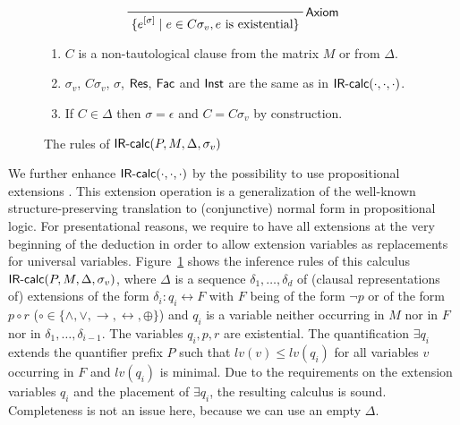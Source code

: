 \documentclass{llncs}
\newcommand{\IRcalcPMSubst}[3]{$\mbox{\sf IR-calc}(#1,#2,#3)$}
\newcommand{\IRcalcPMDSubst}[4]{$\mbox{\sf IR-calc}(#1,#2,#3,#4)$}
\newcommand{\Res}{$\mbox{\sf Res}$}
\newcommand{\Fac}{$\mbox{\sf Fac}$}
\newcommand{\Axiom}{$\mbox{\sf Axiom}$}
\newcommand{\Inst}{$\mbox{\sf Inst}$}
\newcommand{\restrict}[1]{\ensuremath{[#1]}}
\newcommand{\impl}{\rightarrow}
\newcommand{\lequiv}{\leftrightarrow}
\newcommand{\xor}{\oplus}
\newcommand{\level}[1]{{\mathit lv(#1)}}
\begin{document}
\begin{figure}[t]
\begin{mdframed}
\begin{displaymath}
\prfbyaxiom{\Axiom}{\{e^{\restrict{\sigma}} \mid e \in C\sigma_v,
\text{$e$ is existential}\}}
\end{displaymath}

\begin{enumerate}
\item $C$ is a non-tautological clause from the matrix $M$ or from $\Delta$.

\item $\sigma_v$, $C\sigma_v$, $\sigma$, \Res, \Fac{} and \Inst{} are
  the same as in \IRcalcPMSubst{\cdot}{\cdot}{\cdot}.

\item If $C\in \Delta$ then $\sigma = \epsilon$ and $C=C\sigma_v$ by
  construction.

\end{enumerate}
\end{mdframed}
\caption{The rules of  \IRcalcPMDSubst{P}{M}{\Delta}{\sigma_v}
\label{fig:IR-CalcPMD-enhanced}}
\end{figure}

We further enhance \IRcalcPMSubst{\cdot}{\cdot}{\cdot}{} by the
possibility to use propositional extensions
\cite{Tseitin:1968,BCJ-AAAI-WS16}.  This extension operation is a
generalization of the well-known structure-preserving translation to
(conjunctive) normal form in propositional logic.  For presentational
reasons, we require to have all extensions at the very beginning of
the deduction in order to allow extension variables as replacements
for universal variables. Figure~\ref{fig:IR-CalcPMD-enhanced} shows
the inference rules of this calculus
\IRcalcPMDSubst{P}{M}{\Delta}{\sigma_v}, where $\Delta$ is a sequence
$\delta_1,\ldots , \delta_d$ of (clausal representations of)
extensions of the form $\delta_i\colon q_i \lequiv F$ with $F$ being
of the form $\neg p$ or of the form $p\circ r$ ($\circ\in \{\land,
\lor, \impl, \lequiv, \xor\}$) and $q_i$ is a variable neither
occurring in $M$ nor in $F$ nor in $\delta_1, \ldots ,
\delta_{i-1}$. The variables $q_i, p, r$ are existential.  The
quantification $\exists q_i$ extends the quantifier prefix $P$ such
that $\level{v} \leq \level{q_i}$ for all variables $v$ occurring in
$F$ and $\level{q_i}$ is minimal. Due to the requirements on the
extension variables $q_i$ and the placement of $\exists q_i$, the
resulting calculus is sound. Completeness is not an issue here,
because we can use an empty $\Delta$.
\end{document}
